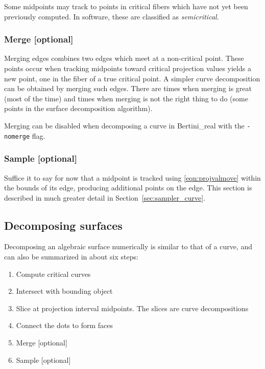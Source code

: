 Some midpoints may track to points in critical fibers which have not yet been previously computed.  In software, these are classified as {\em semicritical}.

\subsubsection{Merge [optional]}

Merging edges combines two edges which meet at a non-critical point.  These points occur when tracking midpoints toward critical projection values yields a new point, one in the fiber of a true critical point.  A simpler curve decomposition can be obtained by merging such edges.  There are times when merging is great (most of the time) and times when merging is not the right thing to do (some points in the surface decomposition algorithm).

Merging can be disabled when decomposing a curve in Bertini\_real with the {\tt -nomerge} flag.


\subsubsection{Sample [optional]}
Suffice it to say for now that a midpoint is tracked using \eqref{eqn:projvalmove} within the bounds of its edge, producing additional points on the edge.  
This section is described in much greater detail in Section~\ref{sec:sampler_curve}.   



















\subsection{Decomposing surfaces}
\label{sec:algo_surface}


Decomposing an algebraic surface numerically is similar to that of a curve, and can also be summarized in about six steps:
%
\begin{enumerate}
\item Compute critical curves
\item Intersect with bounding object
\item Slice at projection interval midpoints.  The slices are curve decompositions
\item Connect the dots to form faces
\item Merge [optional]
\item Sample [optional]
\end{enumerate}


